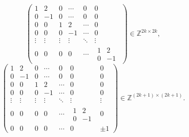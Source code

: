 \begin{solution}
    \[
        \begin{pmatrix}
            1      & 2      & 0      & \cdots & 0      & 0                                           \\
            0      & -1     & 0      & \cdots & 0      & 0                                           \\
            0      & 0      & 1      & 2      & \cdots & 0                                           \\
            0      & 0      & 0      & -1     & \cdots & 0                                           \\
            \vdots & \vdots & \vdots & \vdots & \ddots & \vdots                                      \\
            0      & 0      & 0      & 0      & \cdots & \begin{matrix} 1 & 2 \\ 0 & -1 \end{matrix}
        \end{pmatrix} \in \mathbb{Z}^{2k \times 2k},
    \]
    \[
        \begin{pmatrix}
            1      & 2      & 0      & \cdots & 0      & 0                                           & 0      \\
            0      & -1     & 0      & \cdots & 0      & 0                                           & 0      \\
            0      & 0      & 1      & 2      & \cdots & 0                                           & 0      \\
            0      & 0      & 0      & -1     & \cdots & 0                                           & 0      \\
            \vdots & \vdots & \vdots & \vdots & \ddots & \vdots                                      & \vdots \\
            0      & 0      & 0      & 0      & \cdots & \begin{matrix} 1 & 2 \\ 0 & -1 \end{matrix} & 0      \\
            0      & 0      & 0      & 0      & \cdots & 0                                           & \pm 1
        \end{pmatrix} \in \mathbb{Z}^{\left( 2k+1 \right) \times \left( 2k+1 \right)}.
    \]

\end{solution}

